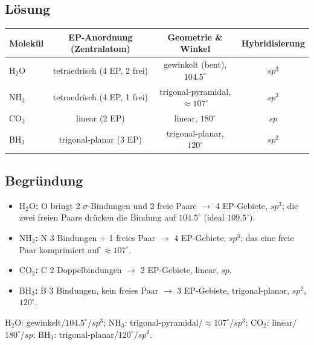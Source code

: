 
\subsection*{Lösung}
\begin{center}
\begin{tabular}{@{}l c c c@{}}
  Molekül & EP-Anordnung (Zentralatom) & Geometrie \& Winkel & Hybridisierung \\
  \hline
  $\mathrm{H_2O}$ & tetraedrisch (4 EP, 2 frei) & gewinkelt (bent),
      $104.5^\circ$ & $sp^3$ \\
  $\mathrm{NH_3}$ & tetraedrisch (4 EP, 1 frei) & trigonal-pyramidal,
      $\approx 107^\circ$ & $sp^3$ \\
  $\mathrm{CO_2}$ & linear (2 EP)               & linear, $180^\circ$       & $sp$  \\
  $\mathrm{BH_3}$ & trigonal-planar (3 EP)      & trigonal-planar,
      $120^\circ$    & $sp^2$ \\
\end{tabular}
\end{center}

\subsection*{Begründung}
\begin{itemize}
  \item \textbf{$\mathrm{H_2O}$:} O bringt 2 $\sigma$-Bindungen und 2 freie
        Paare $\to$ 4 EP-Gebiete, $sp^3$; die zwei freien Paare drücken die
        Bindung auf $104.5^\circ$ (ideal $109.5^\circ$).
  \item \textbf{$\mathrm{NH_3}$:} N 3 Bindungen + 1 freies Paar $\to$ 4
        EP-Gebiete, $sp^3$; das eine freie Paar komprimiert auf $\approx 107^\circ$.
  \item \textbf{$\mathrm{CO_2}$:} C 2 Doppelbindungen $\to$ 2 EP-Gebiete,
        linear, $sp$.
  \item \textbf{$\mathrm{BH_3}$:} B 3 Bindungen, kein freies Paar $\to$ 3
        EP-Gebiete, trigonal-planar, $sp^2$, $120^\circ$.
\end{itemize}

\begin{ergebnis}
$\mathrm{H_2O}$: gewinkelt/$104.5^\circ$/$sp^3$; $\mathrm{NH_3}$:
trigonal-pyramidal/$\approx 107^\circ$/$sp^3$; $\mathrm{CO_2}$:
linear/$180^\circ$/$sp$; $\mathrm{BH_3}$: trigonal-planar/$120^\circ$/$sp^2$.
\end{ergebnis}

